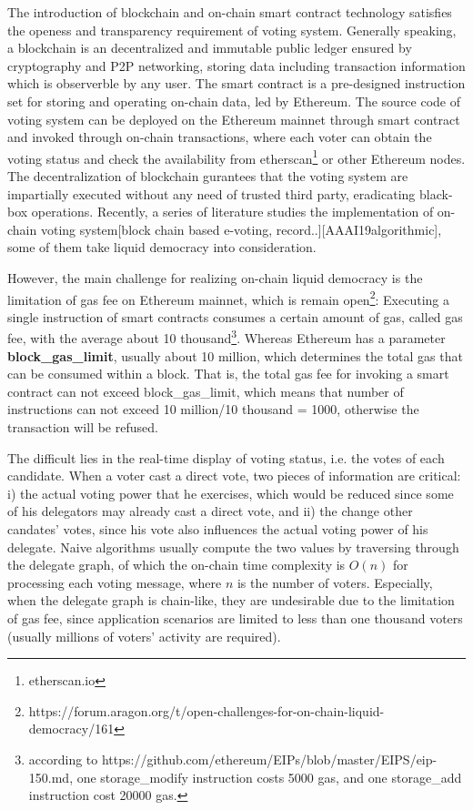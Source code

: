 The introduction of blockchain and on-chain smart contract technology satisfies the openess and transparency requirement of voting system. Generally speaking, a blockchain is an decentralized and immutable public ledger ensured by cryptography and P2P networking, storing data including transaction information which is observerble by any user. The smart contract is a pre-designed instruction set for storing and operating on-chain data, led by Ethereum. The source code of voting system can be deployed on the Ethereum mainnet through smart contract and invoked through on-chain transactions, where each voter can obtain the voting status and check the availability from etherscan\footnote{etherscan.io} or other Ethereum nodes. The decentralization of blockchain gurantees that the voting system are impartially executed without any need of trusted third party, eradicating black-box operations. Recently, a series of literature studies the implementation of on-chain voting system[block chain based e-voting, record..][AAAI19algorithmic], some of them take liquid democracy into consideration. 

However, the main challenge for realizing on-chain liquid democracy is the limitation of gas fee on Ethereum mainnet, which is remain open\footnote{https://forum.aragon.org/t/open-challenges-for-on-chain-liquid-democracy/161}: Executing a single instruction of smart contracts consumes a certain amount of gas, called gas fee, with the average about 10 thousand\footnote{according to https://github.com/ethereum/EIPs/blob/master/EIPS/eip-150.md, one storage\_modify instruction costs 5000 gas, and one storage\_add instruction cost 20000 gas.}.  Whereas Ethereum has a parameter \textbf{block\_gas\_limit}, usually about 10 million, which determines the total gas that can be consumed within a block. That is, the total gas fee for invoking a smart contract can not exceed block\_gas\_limit, which means that number of instructions can not exceed 10 million/10 thousand = 1000, otherwise the transaction will be refused. 

The difficult lies in the real-time display of voting status, i.e. the votes of each candidate. When a voter cast a direct vote, two pieces of information are critical: i) the actual voting power that he exercises, which would be reduced since some of his delegators may already cast a direct vote, and ii) the change other candates' votes, since his vote also influences the actual voting power of his delegate. Naive algorithms  usually compute the two values by traversing through the delegate graph, of which the on-chain time complexity is $O(n)$ for processing each voting message, where $n$ is the number of voters. Especially, when the delegate graph is chain-like, they are undesirable due to the limitation of gas fee, since  application scenarios are limited to less than one thousand voters (usually millions of voters' activity are required). 

